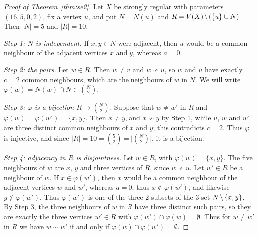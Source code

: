 \documentclass[11pt]{amsart}
\newcommand\diff{\mathbin{\mkern-1.5mu\setminus\mkern-1.5mu}}%
\theoremstyle{definition}
\newcommand{\nb}{N}
\begin{document}
\begin{proof}[Proof of Theorem~\ref{thm:se2}]
Let $X$ be strongly regular with parameters $(16,5,0,2)$, fix a vertex $u$, and put $\nb=\nb(u)$
and $R=V(X)\diff(\{u\}\cup\nb)$. Then $\lvert\nb\rvert=5$ and $\lvert R\rvert=10$.

\emph{Step 1: $\nb$ is independent.} If $x,y\in\nb$ were adjacent, then $u$ would be a common
neighbour of the adjacent vertices $x$ and $y$, whereas $a=0$.

\emph{Step 2: the pairs.} Let $w\in R$. Then $w\ne u$ and $w\not\sim u$, so $w$ and $u$ have
exactly $c=2$ common neighbours, which are the neighbours of $w$ in $\nb$. We will write
$\varphi(w)=\nb(w)\cap\nb\in\binom{\nb}{2}$.

\emph{Step 3: $\varphi$ is a bijection $R\to\binom{\nb}{2}$.} Suppose that $w\ne w'$ in $R$ and
$\varphi(w)=\varphi(w')=\{x,y\}$. Then $x\ne y$, and $x\not\sim y$ by Step 1, while $u$, $w$ and
$w'$ are three distinct common neighbours of $x$ and $y$; this contradicts $c=2$. Thus $\varphi$ is
injective, and since $\lvert R\rvert=10=\binom52=\bigl\lvert\binom{\nb}{2}\bigr\rvert$, it is a
bijection.

\emph{Step 4: adjacency in $R$ is disjointness.} Let $w\in R$, with $\varphi(w)=\{x,y\}$. The five
neighbours of $w$ are $x$, $y$ and three vertices of $R$, since $w\not\sim u$. Let $w'\in R$ be a
neighbour of $w$. If $x\in\varphi(w')$, then $x$ would be a common neighbour of the adjacent
vertices $w$ and $w'$, whereas $a=0$; thus $x\notin\varphi(w')$, and likewise
$y\notin\varphi(w')$. Thus $\varphi(w')$ is one of the three 2-subsets of the 3-set
$\nb\diff\{x,y\}$. By Step 3, the three neighbours of $w$ in $R$ have three distinct such pairs,
so they are exactly the three vertices $w'\in R$ with $\varphi(w')\cap\varphi(w)=\emptyset$. Thus
for $w\ne w'$ in $R$ we have $w\sim w'$ if and only if $\varphi(w)\cap\varphi(w')=\emptyset$.


\end{proof}
\end{document}
